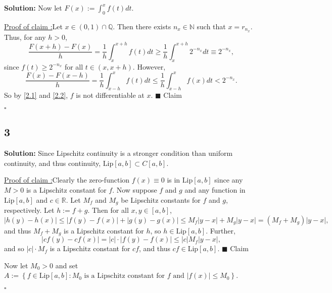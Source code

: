 \documentclass[12pt]{article}
\newcounter{ProofCounter}
\newcounter{ClaimCounter}[ProofCounter]
\newenvironment{Solution}{\stepcounter{ProofCounter}\textbf{Solution:}}{\hfill$\square$}
\newenvironment{claim}[1]{\vspace{1mm}\stepcounter{ClaimCounter}\par\noindent\underline{\bf Claim \theClaimCounter:}\space#1}{}
\newenvironment{claimproof}[1]{\par\noindent\underline{Proof of claim \theClaimCounter:}\space#1}{\hfill $\blacksquare$ Claim \theClaimCounter}
\begin{document}
\begin{Solution}
  Now let $F(x) := \int_{0}^{x}f(t)dt$.

  \begin{claimproof}
    Let $x \in (0,1) \cap \mathbb{Q}$. Then there exists $n_{x} \in \mathbb{N}$ such that $x = r_{n_x}$. Thus, for any $h > 0$,
    \begin{equation}
      \frac{F(x+h) - F(x)}{h} = \frac{1}{h}\int_{x}^{x+h}f(t)dt \geq \frac{1}{h} \int_{x}^{x+h}2^{-n_x}dt \equiv 2^{-n_x},
        \label{2.1}
    \end{equation}
    since $f(t) \geq 2^{-n_x}$ for all $t \in (x, x+h)$. However,
    \begin{equation}
      \frac{F(x) - F(x-h)}{h} = \frac{1}{h}\int_{x-h}^{x}f(t)dt \leq \frac{1}{h}\int_{x-h}^{x}f(x)dt < 2^{-n_x}.
      \label{2.2}
    \end{equation}
    So by \eqref{2.1} and \eqref{2.2}, $f$ is not differentiable at $x$.
  \end{claimproof}

\end{Solution}



\subsection*{3}
\begin{Solution}
  Since Lipschitz continuity is a stronger condition than uniform continuity, and thus continuity, $\text{Lip}[a,b] \subset C[a,b]$. 

  \begin{claimproof}
    Clearly the zero-function $f(x) \equiv 0$ is in $\text{Lip}[a,b]$ since any $M > 0$ is a Lipschitz constant for $f$. Now suppose $f$ and $g$ and
    any function in $\text{Lip}[a,b]$ and $c \in \mathbb{R}$. Let $M_f$ and $M_g$ be Lipschitz constants for $f$ and $g$, respectively. Let $h := f +
    g$. Then for all
    $x, y \in [a,b]$,
    \[
      |h(y) - h(x)| \leq |f(y) - f(x)| + |g(y) - g(x)| \leq M_f |y - x| + M_g |y - x| = (M_f + M_g) |y - x|,
    \]
    and thus $M_f + M_g$ is a Lipschitz constant for $h$, so $h \in \text{Lip}[a,b]$. Further,
    \[
      |cf(y) - cf(x)| = |c| \cdot |f(y) - f(x)| \leq |c| M_f |y - x|,
    \]
    and so $|c|\cdot M_f$ is a Lipschitz constant for $cf$, and thus $cf \in \text{Lip}[a,b]$.
  \end{claimproof}

  Now let $M_0 > 0$ and set $A := \left\{ f \in \text{Lip}[a,b] : M_0\text{ is a Lipschitz constant for $f$ and }|f(x)| \leq M_0 \right\}$.


\end{Solution}
\end{document}
